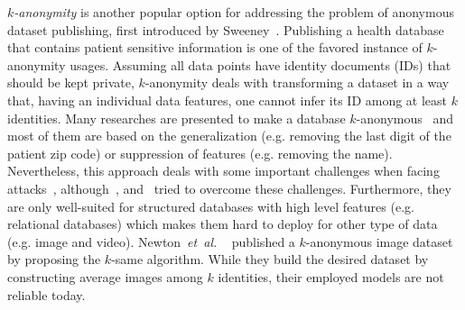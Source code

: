 \documentclass[10pt,journal,compsoc]{IEEEtran}
\newcommand{\latinphrase}[1]{\textit{#1}}
\newcommand{\etal}{\latinphrase{et~al. }}
\begin{document}
\emph{$k$-anonymity} is another popular option for addressing the problem of anonymous dataset publishing, first introduced by Sweeney~\cite{sweeney2002}. Publishing a health database that contains patient sensitive information is one of the favored instance of $k$-anonymity usages. Assuming all data points have identity documents (IDs) that should be kept private, $k$-anonymity deals with transforming a dataset in a way that, having an individual data features, one cannot infer its ID among at least $k$ identities. Many researches are presented to make a database $k$-anonymous~\cite{fung2005,wang2004,bayardo2005,lefevre2006} and most of them are based on the generalization (e.g. removing the last digit of the patient zip code) or suppression of features (e.g. removing the name). Nevertheless, this approach deals with some important challenges when facing attacks~\cite{aggarwal2008}, although~\cite{machanavajjhala2007}, \cite{li2007} and~\cite{rebollo2010} tried to overcome these challenges. Furthermore, they are only well-suited for structured databases with high level features (e.g. relational databases) which makes them hard to deploy for other type of data (e.g. image and video). Newton~\etal~\cite{newton2005} published a $k$-anonymous image dataset by proposing the $k$-same algorithm. While they build the desired dataset by constructing average images among $k$ identities, their employed models are not reliable today.

\end{document}
